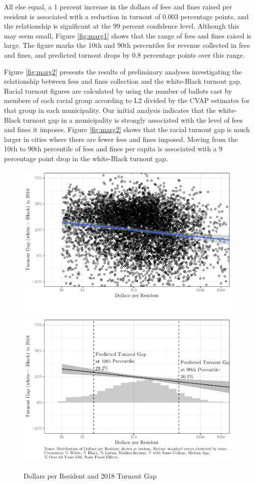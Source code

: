 \documentclass[
  12pt,
]{article}
\begin{document}
All else equal, a 1 percent increase in the dollars of fees and fines raised per resident is associated with a reduction in turnout of 0.003 percentage points, and the relationship is significant at the 99 percent confidence level. Although this may seem small, Figure \ref{fig:marg1} shows that the range of fees and fines raised is large. The figure marks the 10th and 90th percentiles for revenue collected in fees and fines, and predicted turnout drops by 0.8 percentage points over this range.

Figure \ref{fig:marg2} presents the results of preliminary analyses investigating the relationship between fees and fines collection and the white-Black turnout gap. Racial turnout figures are calculated by using the number of ballots cast by members of each racial group according to L2 divided by the CVAP estimates for that group in each municipality. Our initial analysis indicates that the white-Black turnout gap in a municipality is strongly associated with the level of fees and fines it imposes. Figure \ref{fig:marg2} shows that the racial turnout gap is much larger in cities where there are fewer fees and fines imposed. Moving from the 10th to 90th percentile of fees and fines per capita is associated with a 9 percentage point drop in the white-Black turnout gap.

\begin{figure}[H]
\includegraphics[width=0.5\linewidth]{fees_fines_to_files/figure-latex/unnamed-chunk-1-1} \includegraphics[width=0.5\linewidth]{fees_fines_to_files/figure-latex/unnamed-chunk-1-2} \caption{\label{fig:marg2}Dollars per Resident and 2018 Turnout Gap}\label{fig:unnamed-chunk-1}
\end{figure}
\end{document}
